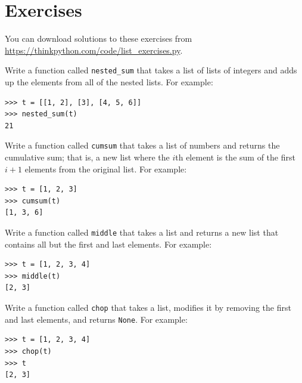 \documentclass[10pt]{book}
\begin{document}
\section{Exercises}

You can download solutions to these exercises from
\url{https://thinkpython.com/code/list_exercises.py}.

\begin{exercise}

Write a function called \verb"nested_sum" that takes a list of lists
of integers and adds up the elements from all of the nested lists.
For example:

\begin{verbatim}
>>> t = [[1, 2], [3], [4, 5, 6]]
>>> nested_sum(t)
21
\end{verbatim}

\end{exercise}

\begin{exercise}
\label{cumulative}

Write a function called {\tt cumsum} that takes a list of numbers and
returns the cumulative sum; that is, a new list where the $i$th
element is the sum of the first $i+1$ elements from the original list.
For example:

\begin{verbatim}
>>> t = [1, 2, 3]
>>> cumsum(t)
[1, 3, 6]
\end{verbatim}

\end{exercise}

\begin{exercise}

Write a function called \verb"middle" that takes a list and
returns a new list that contains all but the first and last
elements.  For example:

\begin{verbatim}
>>> t = [1, 2, 3, 4]
>>> middle(t)
[2, 3]
\end{verbatim}

\end{exercise}

\begin{exercise}

Write a function called \verb"chop" that takes a list, modifies it
by removing the first and last elements, and returns {\tt None}.
For example:

\begin{verbatim}
>>> t = [1, 2, 3, 4]
>>> chop(t)
>>> t
[2, 3]
\end{verbatim}

\end{exercise}
\end{document}

